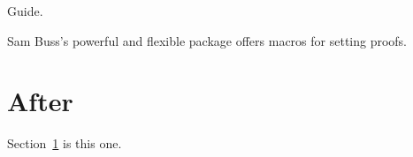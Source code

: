 \documentclass{article}
\begin{document}
\begin{center}\centering Guide.\end{center}
Sam Buss's powerful and flexible package offers macros for setting proofs.
\section{After}\label{after}
Section~\ref{after} is this one.
\end{document}
